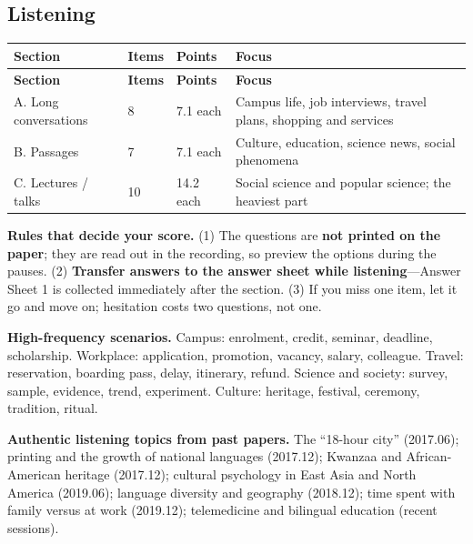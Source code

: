 \subsection{Listening}

\begin{center}
\small
\begin{longtable}{p{3.4cm}p{2.0cm}p{2.4cm}p{6.8cm}}
\toprule
\textbf{Section} & \textbf{Items} & \textbf{Points} & \textbf{Focus} \\
\midrule
\endfirsthead
\toprule
\textbf{Section} & \textbf{Items} & \textbf{Points} & \textbf{Focus} \\
\midrule
\endhead
A. Long conversations & 8 & 7.1 each & Campus life, job interviews, travel plans, shopping and services \\
\midrule
B. Passages & 7 & 7.1 each & Culture, education, science news, social phenomena \\
\midrule
C. Lectures / talks & 10 & 14.2 each & Social science and popular science; the heaviest part \\
\bottomrule
\end{longtable}
\end{center}

\noindent\textbf{Rules that decide your score.}\quad
(1) The questions are \textbf{not printed on the paper}; they are read out in the recording, so preview the options during the pauses.
(2) \textbf{Transfer answers to the answer sheet while listening}---Answer Sheet 1 is collected immediately after the section.
(3) If you miss one item, let it go and move on; hesitation costs two questions, not one.
\par
\medskip
\noindent\textbf{High-frequency scenarios.}\quad
Campus: enrolment, credit, seminar, deadline, scholarship.
Workplace: application, promotion, vacancy, salary, colleague.
Travel: reservation, boarding pass, delay, itinerary, refund.
Science and society: survey, sample, evidence, trend, experiment.
Culture: heritage, festival, ceremony, tradition, ritual.
\par

\noindent\textbf{Authentic listening topics from past papers.}\quad
The ``18-hour city'' (2017.06); printing and the growth of national languages (2017.12); Kwanzaa and African-American heritage (2017.12); cultural psychology in East Asia and North America (2019.06); language diversity and geography (2018.12); time spent with family versus at work (2019.12); telemedicine and bilingual education (recent sessions).
\par
